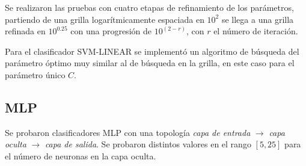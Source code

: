 \documentclass[12pt,bibliography=oldstyle,DIV=12,parskip=half-,titlepage]{scrartcl}
\begin{document}
Se realizaron las pruebas con cuatro etapas de refinamiento de los
parámetros, partiendo de una grilla logarítmicamente espaciada en
$10^2$ se llega a una grilla refinada en $10^{0.25}$ con una
progresión de $10^{(2-r)}$, con $r$ el número de iteración.

Para el clasificador SVM-LINEAR se implementó un algoritmo de búsqueda
del parámetro óptimo muy similar al de búsqueda en la grilla, en este
caso para el parámetro único $C$.


\subsection{MLP}

Se probaron clasificadores MLP con una topología \emph{capa de
  entrada} $\rightarrow$ \emph{capa oculta} $\rightarrow$ \emph{capa
  de salida}. Se probaron distintos valores en el rango $[5,25]$ para
el número de neuronas en la capa oculta.
\end{document}

